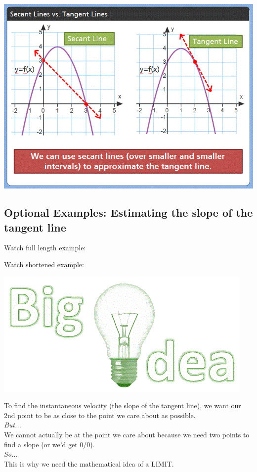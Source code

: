 \documentclass{ximera}
\begin{document}
\begin{image}
\includegraphics{picture6.gif}
\end{image}

\subsection{Optional Examples: Estimating the slope of the tangent line}

Watch full length example:
\begin{foldable}
\end{foldable}

Watch shortened example: 
\begin{foldable}
\end{foldable}

\begin{image}
\includegraphics{bigidea.gif}
\end{image}
To find the instantaneous velocity (the slope of the tangent line), we want our 2nd point to be as close to the point we care about as possible. \\
\textit{But...} \\
We cannot actually be at the point we care about because we need two points to find a slope (or we'd get 0/0). \\
\textit{So...} \\
This is why we need the mathematical idea of a LIMIT.
\end{document}
